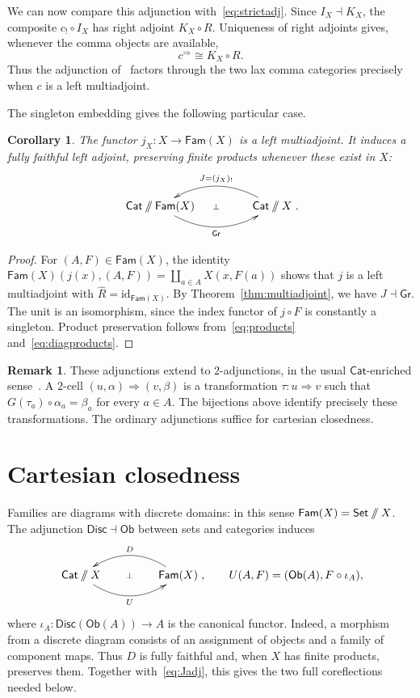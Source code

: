 \documentclass[11pt,a4paper]{amsart}
\makeatletter
\newtheorem{corollary}[theorem]{Corollary}
\theoremstyle{definition}
\newtheorem{remark}[theorem]{Remark}
\numberwithin{equation}{section}
\newcommand{\Cat}{\mathsf{Cat}}
\newcommand{\Set}{\mathsf{Set}}
\newcommand{\Fam}{\mathsf{Fam}}
\newcommand{\Gr}{\mathsf{Gr}}
\newcommand{\Disc}{\mathsf{Disc}}
\newcommand{\Ob}{\mathsf{Ob}}
\newcommand{\id}{\mathrm{id}}
\newcommand{\sslash}{\mathbin{/\mkern-6mu/}}
\newcommand{\DX}{\Cat\sslash X}
\newcommand{\Adj}[4]{\xymatrix@C=4.5em{#1\ar@/_1.5pc/[r]_{#4}& #2\ar@/_1.5pc/[l]_{#3}\ar@{}[l]|{\bot}}}
\makeatother
\begin{document}
We can now compare this adjunction with~\eqref{eq:strictadj}. Since $I_X\dashv K_X$, the composite $c_!\circ I_X$ has right adjoint $K_X\circ R$. Uniqueness of right adjoints gives, whenever the comma objects are available,
\begin{equation}\label{eq:comparison}
 c^{\Rightarrow}\cong K_X\circ R.
\end{equation}
Thus the adjunction of~\cite{CN2} factors through the two lax comma categories precisely when $c$ is a left multiadjoint.

The singleton embedding gives the following particular case.

\begin{corollary}\label{cor:flatten}
The functor $j_X:X\to\Fam(X)$ is a left multiadjoint. It induces a fully faithful left adjoint, preserving finite products whenever these exist in $X$:
\begin{equation}\label{eq:Jadj}
 \Adj{\Cat\sslash\Fam(X)}{\DX}{J=(j_X)_!}{\Gr}.
\end{equation}
\end{corollary}
\begin{proof}
For $(A,F)\in\Fam(X)$, the identity
$\Fam(X)(j(x),(A,F))=\coprod_{a\in A}X(x,F(a))$
shows that $j$ is a left multiadjoint with $\widehat R=\id_{\Fam(X)}$. By Theorem~\ref{thm:multiadjoint}, we have $J\dashv\Gr$. The unit is an isomorphism, since the index functor of $j\circ F$ is constantly a singleton. Product preservation follows from~\eqref{eq:products} and~\eqref{eq:diagproducts}.
\end{proof}

\begin{remark}
These adjunctions extend to $2$-adjunctions, in the usual $\Cat$-enriched sense~\cite{KS}. A $2$-cell $(u,\alpha)\Rightarrow(v,\beta)$ is a transformation $\tau:u\Rightarrow v$ such that $G(\tau_a)\circ\alpha_a=\beta_a$ for every $a\in A$. The bijections above identify precisely these transformations. The ordinary adjunctions suffice for cartesian closedness.
\end{remark}

\section{Cartesian closedness}

Families are diagrams with discrete domains: in this sense $\Fam(X)=\Set\sslash X$. The adjunction $\Disc\dashv\Ob$ between sets and categories induces
\begin{equation}\label{eq:discreteadj}
 \Adj{\DX}{\Fam(X)}{D}{U},
 \qquad U(A,F)=(\Ob(A),F\circ\iota_A),
\end{equation}
where $\iota_A:\Disc(\Ob(A))\to A$ is the canonical functor. Indeed, a morphism from a discrete diagram consists of an assignment of objects and a family of component maps. Thus $D$ is fully faithful and, when $X$ has finite products, preserves them. Together with~\eqref{eq:Jadj}, this gives the two full coreflections needed below.
\end{document}
